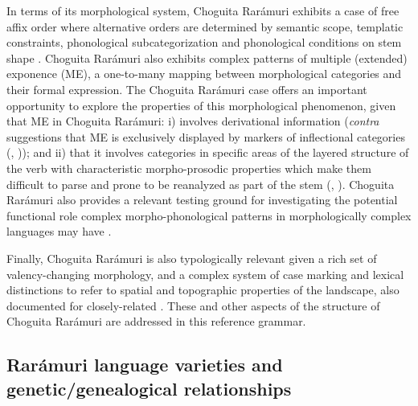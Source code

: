 In terms of its morphological system, Choguita Rarámuri exhibits a case of free affix order where alternative orders are determined by semantic scope, templatic constraints, phonological subcategorization and phonological conditions on stem shape \parencite{caballero2010scope}. Choguita Rarámuri also exhibits complex patterns of multiple (extended) exponence (ME), a one-to-many mapping between morphological categories and their formal expression. The Choguita Rarámuri case offers an important opportunity to explore the properties of this morphological phenomenon, given that ME in Choguita Rarámuri: i) involves derivational information (\textit{contra} suggestions that ME is exclusively displayed by markers of inflectional categories (\citealt{matthews1972inflectional}, \citealt{stump2001inflectional})); and ii) that it involves categories in specific areas of the layered structure of the verb with characteristic morpho-prosodic properties which make them difficult to parse and prone to be reanalyzed as part of the stem (\citealt{caballero2008choguita}, \citealt{caballero2011morphologically}). Choguita Rarámuri also provides a relevant testing ground for investigating the potential functional role complex morpho-phonological patterns in morphologically complex languages may have \citep{caballero2015perceptual,kapatsinski2021agglutinative}.


Finally, Choguita Rarámuri is also typologically relevant given a rich set of valency-changing morphology, and a complex system of case marking and lexical distinctions to refer to spatial and topographic properties of the landscape, also documented for closely-related  \parencite{miller1996guarijio}. These and other aspects of the structure of Choguita Rarámuri are addressed in this reference grammar.

\subsection{Rarámuri language varieties and genetic/genealogical relationships}
\label{subsec: varieties and genetic relationships}

